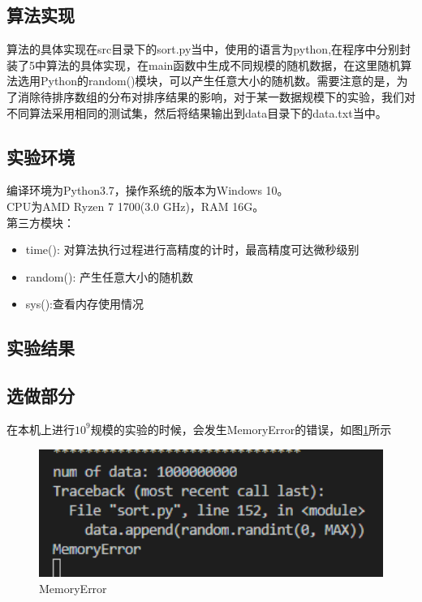 \documentclass[UTF8]{ctexart}
\begin{document}
\subsection{算法实现}

算法的具体实现在src目录下的sort.py当中，使用的语言为python,在程序中分别封装了5中算法的具体实现，在main函数中生成不同规模的随机数据，在这里随机算法选用Python的random()模块，可以产生任意大小的随机数。需要注意的是，为了消除待排序数组的分布对排序结果的影响，对于某一数据规模下的实验，我们对不同算法采用相同的测试集，然后将结果输出到data目录下的data.txt当中。

\subsection{实验环境}
编译环境为Python3.7，操作系统的版本为Windows 10。\\
CPU为AMD Ryzen 7 1700(3.0 GHz)，RAM 16G。\\
第三方模块：
\begin{itemize}
\item time(): 对算法执行过程进行高精度的计时，最高精度可达微秒级别
\item random(): 产生任意大小的随机数
\item sys():查看内存使用情况
\end{itemize}

\subsection{实验结果}



\subsection{选做部分}

在本机上进行$10^9$规模的实验的时候，会发生MemoryError的错误，如图\ref{error}所示\\

\begin{figure}[H]
    \centering
    \includegraphics[width=1\textwidth]{img/error.png}
    \caption{MemoryError}
    \label{error}
\end{figure}
\end{document}
